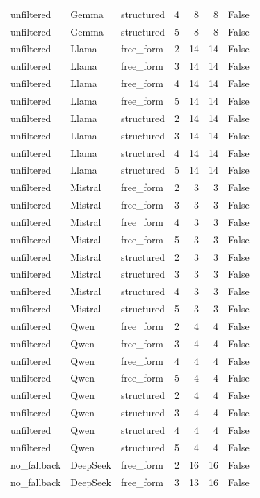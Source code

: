 \begin{longtable}{lllrrrr}
unfiltered & Gemma & structured & 4 & 8 & 8 & False \\
unfiltered & Gemma & structured & 5 & 8 & 8 & False \\
unfiltered & Llama & free\_form & 2 & 14 & 14 & False \\
unfiltered & Llama & free\_form & 3 & 14 & 14 & False \\
unfiltered & Llama & free\_form & 4 & 14 & 14 & False \\
unfiltered & Llama & free\_form & 5 & 14 & 14 & False \\
unfiltered & Llama & structured & 2 & 14 & 14 & False \\
unfiltered & Llama & structured & 3 & 14 & 14 & False \\
unfiltered & Llama & structured & 4 & 14 & 14 & False \\
unfiltered & Llama & structured & 5 & 14 & 14 & False \\
unfiltered & Mistral & free\_form & 2 & 3 & 3 & False \\
unfiltered & Mistral & free\_form & 3 & 3 & 3 & False \\
unfiltered & Mistral & free\_form & 4 & 3 & 3 & False \\
unfiltered & Mistral & free\_form & 5 & 3 & 3 & False \\
unfiltered & Mistral & structured & 2 & 3 & 3 & False \\
unfiltered & Mistral & structured & 3 & 3 & 3 & False \\
unfiltered & Mistral & structured & 4 & 3 & 3 & False \\
unfiltered & Mistral & structured & 5 & 3 & 3 & False \\
unfiltered & Qwen & free\_form & 2 & 4 & 4 & False \\
unfiltered & Qwen & free\_form & 3 & 4 & 4 & False \\
unfiltered & Qwen & free\_form & 4 & 4 & 4 & False \\
unfiltered & Qwen & free\_form & 5 & 4 & 4 & False \\
unfiltered & Qwen & structured & 2 & 4 & 4 & False \\
unfiltered & Qwen & structured & 3 & 4 & 4 & False \\
unfiltered & Qwen & structured & 4 & 4 & 4 & False \\
unfiltered & Qwen & structured & 5 & 4 & 4 & False \\
no\_fallback & DeepSeek & free\_form & 2 & 16 & 16 & False \\
no\_fallback & DeepSeek & free\_form & 3 & 13 & 16 & False \\

\end{longtable}

